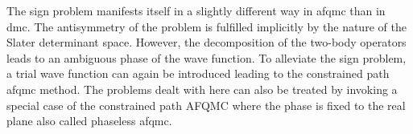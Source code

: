 The sign problem manifests itself in a slightly different way in \gls{afqmc} than in \gls{dmc}.
The antisymmetry of the problem is fulfilled implicitly by the nature of the Slater determinant space.
However, the decomposition of the two-body operators leads to an ambiguous phase of the wave function.
To alleviate the sign problem, a trial wave function can again be introduced leading to the constrained path \gls{afqmc} method.\cite{10.1103/PhysRevB.55.7464,10.1103/PhysRevLett.74.3652}
The problems dealt with here can also be treated by invoking a special case of the constrained path AFQMC where the phase is fixed to the real plane also called phaseless \gls{afqmc}.\cite{10.1103/PhysRevLett.90.136401}


